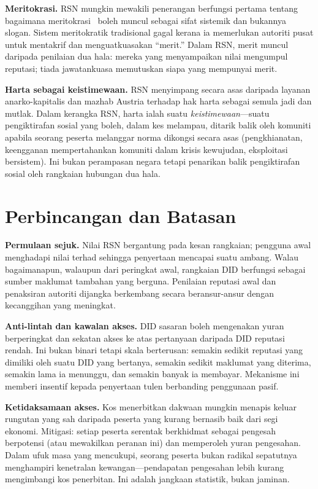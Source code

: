 \documentclass[11pt,a4paper,twocolumn]{article}
\begin{document}
\textbf{Meritokrasi.} RSN mungkin mewakili penerangan berfungsi pertama tentang bagaimana meritokrasi~\cite{young1958} boleh muncul sebagai sifat sistemik dan bukannya slogan. Sistem meritokratik tradisional gagal kerana ia memerlukan autoriti pusat untuk mentakrif dan menguatkuasakan ``merit.'' Dalam RSN, merit muncul daripada penilaian dua hala: mereka yang menyampaikan nilai mengumpul reputasi; tiada jawatankuasa memutuskan siapa yang mempunyai merit.

\textbf{Harta sebagai keistimewaan.} RSN menyimpang secara asas daripada layanan anarko-kapitalis dan mazhab Austria terhadap hak harta sebagai semula jadi dan mutlak. Dalam kerangka RSN, harta ialah suatu \emph{keistimewaan}---suatu pengiktirafan sosial yang boleh, dalam kes melampau, ditarik balik oleh komuniti apabila seorang peserta melanggar norma dikongsi secara asas (pengkhianatan, keengganan mempertahankan komuniti dalam krisis kewujudan, eksploitasi bersistem). Ini bukan perampasan negara tetapi penarikan balik pengiktirafan sosial oleh rangkaian hubungan dua hala.

\section{Perbincangan dan Batasan}

\textbf{Permulaan sejuk.} Nilai RSN bergantung pada kesan rangkaian; pengguna awal menghadapi nilai terhad sehingga penyertaan mencapai suatu ambang. Walau bagaimanapun, walaupun dari peringkat awal, rangkaian DID berfungsi sebagai sumber maklumat tambahan yang berguna. Penilaian reputasi awal dan penaksiran autoriti dijangka berkembang secara beransur-ansur dengan kecanggihan yang meningkat.

\textbf{Anti-lintah dan kawalan akses.} DID sasaran boleh mengenakan yuran berperingkat dan sekatan akses ke atas pertanyaan daripada DID reputasi rendah. Ini bukan binari tetapi skala berterusan: semakin sedikit reputasi yang dimiliki oleh suatu DID yang bertanya, semakin sedikit maklumat yang diterima, semakin lama ia menunggu, dan semakin banyak ia membayar. Mekanisme ini memberi insentif kepada penyertaan tulen berbanding penggunaan pasif.

\textbf{Ketidaksamaan akses.} Kos menerbitkan dakwaan mungkin menapis keluar rungutan yang sah daripada peserta yang kurang bernasib baik dari segi ekonomi. Mitigasi: setiap peserta serentak berkhidmat sebagai pengesah berpotensi (atau mewakilkan peranan ini) dan memperoleh yuran pengesahan. Dalam ufuk masa yang mencukupi, seorang peserta bukan radikal sepatutnya menghampiri kenetralan kewangan---pendapatan pengesahan lebih kurang mengimbangi kos penerbitan. Ini adalah jangkaan statistik, bukan jaminan.
\end{document}

